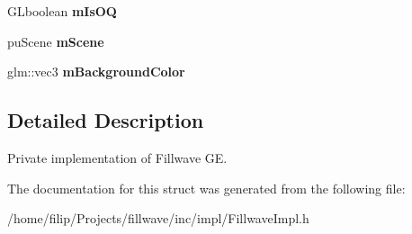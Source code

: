 \begin{DoxyCompactItemize}
\item 
G\+Lboolean {\bfseries m\+Is\+OQ}\hypertarget{structflw_1_1Engine_1_1EngineImpl_accd81c47bb4d498f9553de8bfb10dcaa}{}\label{structflw_1_1Engine_1_1EngineImpl_accd81c47bb4d498f9553de8bfb10dcaa}

\item 
pu\+Scene {\bfseries m\+Scene}\hypertarget{structflw_1_1Engine_1_1EngineImpl_a96b18da35e79c7bc1a319f4b562a9b21}{}\label{structflw_1_1Engine_1_1EngineImpl_a96b18da35e79c7bc1a319f4b562a9b21}

\item 
glm\+::vec3 {\bfseries m\+Background\+Color}\hypertarget{structflw_1_1Engine_1_1EngineImpl_a6919df7b28894958ae3aa80cebf3173b}{}\label{structflw_1_1Engine_1_1EngineImpl_a6919df7b28894958ae3aa80cebf3173b}

\end{DoxyCompactItemize}


\subsection{Detailed Description}
Private implementation of Fillwave GE. 

The documentation for this struct was generated from the following file\+:\begin{DoxyCompactItemize}
\item 
/home/filip/\+Projects/fillwave/inc/impl/Fillwave\+Impl.\+h\end{DoxyCompactItemize}
